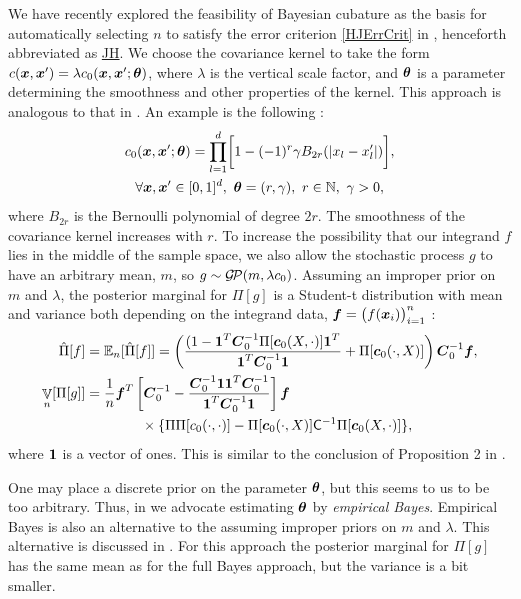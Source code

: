 \documentclass[sts]{imsart}
\numberwithin{equation}{section}
\theoremstyle{plain}
\newcommand{\vC}{\boldsymbol{C}}
\newcommand{\calGP}{\cg\!\cp}
\DeclareMathOperator{\Var}{\mathbb{V}}
\newcommand{\JH}{\hyperlink{RatHic18a}{JH}\xspace}
\begin{document}
We have recently explored the feasibility of Bayesian cubature as the basis for automatically selecting $n$ to satisfy the error criterion \eqref{HJErrCrit}  in \cite{RatHic19a}, henceforth abbreviated as \JH.  We choose the covariance kernel to take the form $c(\boldsymbol{x}, \boldsymbol{x}') =  \lambda c_0(\boldsymbol{x}, \boldsymbol{x}'; \boldsymbol{\theta})$, where $\lambda$ is the vertical scale factor, and $\boldsymbol{\theta}$ is a parameter determining the smoothness and other properties of the kernel.  This approach is analogous to that in \cite[Proposition 2]{BriEtal18a}.  An example is  the following \cite[(36)]{RatHic19a}:
\begin{multline}
\label{the_kernel_eqn_bernoulli}
c_0(\vx, \vx';\vtheta) =
\prod_{l=1}^d \biggl[
1 - (-1)^{r} \gamma B_{2r}( |{x_l-x'_l}| ) \biggr], \\  
\forall \vx,\vx' \in [0,1]^d, \  \vtheta = (r,\gamma), \ r \in \naturals, \ \gamma > 0,
\end{multline}
where $B_{2r}$ is the Bernoulli polynomial of degree $2r$.  The smoothness of the covariance kernel increases with $r$.  To increase the possibility that our integrand $f$ lies in the middle of the sample space, we also allow the stochastic process $g$ to have an arbitrary mean, $m$, so $g \sim \calGP(m, \lambda c_0)$.  Assuming an improper prior on $m$ and $\lambda$, the posterior marginal for $\Pi[g]$ is  a Student-t distribution with mean and variance both depending on the integrand data, $\boldsymbol{f} = \bigl( f(\boldsymbol{x}_i) \bigr)_{i=1}^n$ \cite[(15), (16)]{RatHic19a}:
\begin{align*}
    \hat{\Pi}[f] & =  \Ex_n[\hat{\Pi}[f]] =
\left(
\frac{  (1 - \vone^T  \vC^{-1}_0\Pi[\vc_0(X,\cdot) ] \vone^T }{ \vone^T  \vC^{-1}_0 \vone}   +  \Pi[\vc_0(\cdot, X)]
\right)  \vC^{-1}_0 \vf, \\
\Var_n[\Pi[g]] & = \frac{1}{n}
 \vf^T \left[  \vC^{-1}_0 - 
\frac{  \vC^{-1}_0 \vone \vone^T  \vC^{-1}_0 }{\vone^T  \vC^{-1}_0 \vone}
\right] \vf \\
\label{eqn:errMLE}
&\qquad \qquad \times 
\{\Pi\Pi[c_0(\cdot,\cdot)] - \Pi[\vc_0(\cdot, X)]\mC^{-1} \Pi[\vc_0(X,\cdot)] \},
\end{align*}
where $\boldsymbol{1}$ is a vector of ones.  This is similar to the conclusion of Proposition 2 in \cite{BriEtal18a}.  

One may place a discrete prior on the parameter $\boldsymbol{\theta}$, but this seems to us to be too arbitrary.  Thus, in \cite{RatHic19a} we advocate estimating $\boldsymbol{\theta}$ by \emph{empirical Bayes}.  Empirical Bayes is also an alternative to the assuming improper priors on $m$ and $\lambda$.  This alternative is discussed in \cite{RatHic19a}.  For this approach the posterior marginal for $\Pi[g]$ has the same mean as for the full Bayes approach, but the variance is a bit smaller.  
\end{document}
